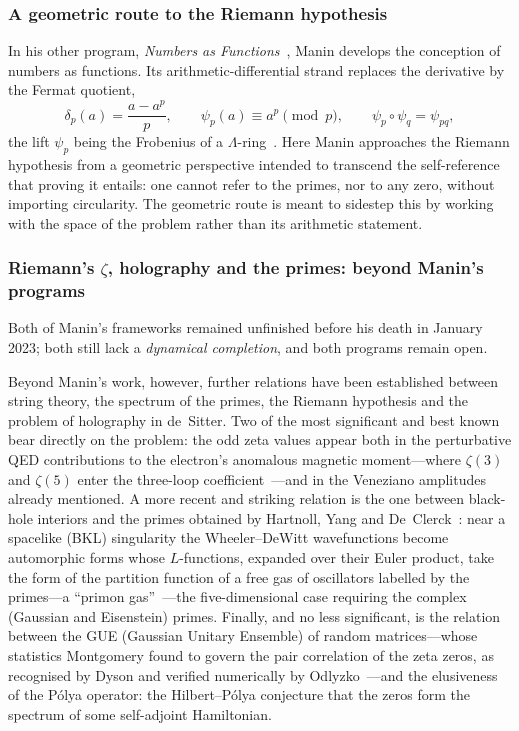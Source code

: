 \subsubsection{A geometric route to the Riemann hypothesis}
In his other program, \emph{Numbers as Functions}~\cite{manin13}, Manin develops the conception of numbers as
functions. Its arithmetic-differential strand replaces the derivative by the Fermat quotient,
\begin{equation}
\delta_p(a)=\frac{a-a^{p}}{p},\qquad \psi_p(a)\equiv a^{p}\!\!\pmod p,\qquad \psi_p\circ\psi_q=\psi_{pq},
\end{equation}
the lift $\psi_p$ being the Frobenius of a $\Lambda$-ring~\cite{buium05}. Here Manin approaches the Riemann
hypothesis from a geometric perspective intended to transcend the self-reference that proving it entails: one
cannot refer to the primes, nor to any zero, without importing circularity. The geometric route is meant to
sidestep this by working with the space of the problem rather than its arithmetic statement.

\subsubsection{Riemann's $\zeta$, holography and the primes: beyond Manin's programs}\label{sssec:zeta-primes}
Both of Manin's frameworks remained unfinished before his death in January 2023; both still lack a \emph{dynamical
completion}, and both programs remain open.

Beyond Manin's work, however, further relations have been established between string theory, the spectrum of the primes, the Riemann hypothesis and the problem of holography in de~Sitter. Two of the most significant and best known bear directly on the problem: the odd zeta values appear both
in the perturbative QED contributions to the electron's anomalous magnetic moment---where $\zeta(3)$ and $\zeta(5)$
enter the three-loop coefficient~\cite{LaportaRemiddi96}---and in the Veneziano amplitudes already mentioned. A
more recent and striking relation is the one between black-hole interiors and the primes obtained by Hartnoll, Yang
and De~Clerck~\cite{HartnollYang25,DeClerckHartnollYang25}: near a spacelike (BKL) singularity the Wheeler--DeWitt
wavefunctions become automorphic forms whose $L$-functions, expanded over their Euler product, take the form of the
partition function of a free gas of oscillators labelled by the primes---a ``primon gas''~\cite{Julia90}---the
five-dimensional case requiring the complex (Gaussian and Eisenstein) primes. Finally, and no less significant, is
the relation between the GUE (Gaussian Unitary Ensemble) of random matrices---whose statistics Montgomery found to
govern the pair correlation of the zeta zeros, as recognised by Dyson and verified numerically by
Odlyzko~\cite{Montgomery73,Odlyzko87}---and the elusiveness of the P\'olya operator: the Hilbert--P\'olya
conjecture that the zeros form the spectrum of some self-adjoint Hamiltonian.

